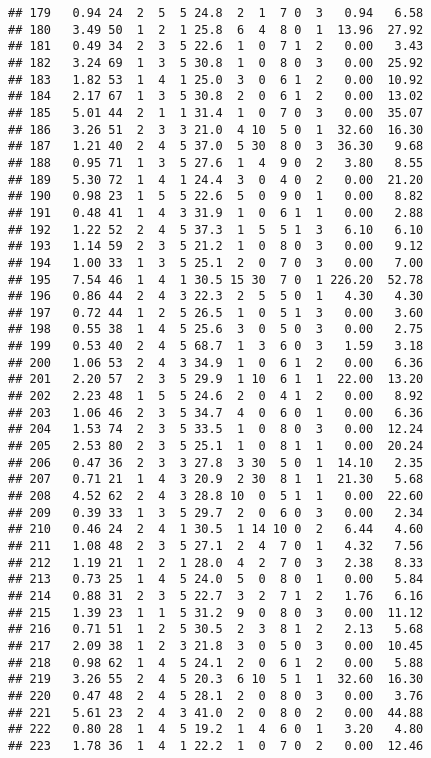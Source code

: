 \documentclass[
]{article}
\begin{document}
\begin{verbatim}
## 179   0.94 24  2  5  5 24.8  2  1  7 0  3   0.94   6.58
## 180   3.49 50  1  2  1 25.8  6  4  8 0  1  13.96  27.92
## 181   0.49 34  2  3  5 22.6  1  0  7 1  2   0.00   3.43
## 182   3.24 69  1  3  5 30.8  1  0  8 0  3   0.00  25.92
## 183   1.82 53  1  4  1 25.0  3  0  6 1  2   0.00  10.92
## 184   2.17 67  1  3  5 30.8  2  0  6 1  2   0.00  13.02
## 185   5.01 44  2  1  1 31.4  1  0  7 0  3   0.00  35.07
## 186   3.26 51  2  3  3 21.0  4 10  5 0  1  32.60  16.30
## 187   1.21 40  2  4  5 37.0  5 30  8 0  3  36.30   9.68
## 188   0.95 71  1  3  5 27.6  1  4  9 0  2   3.80   8.55
## 189   5.30 72  1  4  1 24.4  3  0  4 0  2   0.00  21.20
## 190   0.98 23  1  5  5 22.6  5  0  9 0  1   0.00   8.82
## 191   0.48 41  1  4  3 31.9  1  0  6 1  1   0.00   2.88
## 192   1.22 52  2  4  5 37.3  1  5  5 1  3   6.10   6.10
## 193   1.14 59  2  3  5 21.2  1  0  8 0  3   0.00   9.12
## 194   1.00 33  1  3  5 25.1  2  0  7 0  3   0.00   7.00
## 195   7.54 46  1  4  1 30.5 15 30  7 0  1 226.20  52.78
## 196   0.86 44  2  4  3 22.3  2  5  5 0  1   4.30   4.30
## 197   0.72 44  1  2  5 26.5  1  0  5 1  3   0.00   3.60
## 198   0.55 38  1  4  5 25.6  3  0  5 0  3   0.00   2.75
## 199   0.53 40  2  4  5 68.7  1  3  6 0  3   1.59   3.18
## 200   1.06 53  2  4  3 34.9  1  0  6 1  2   0.00   6.36
## 201   2.20 57  2  3  5 29.9  1 10  6 1  1  22.00  13.20
## 202   2.23 48  1  5  5 24.6  2  0  4 1  2   0.00   8.92
## 203   1.06 46  2  3  5 34.7  4  0  6 0  1   0.00   6.36
## 204   1.53 74  2  3  5 33.5  1  0  8 0  3   0.00  12.24
## 205   2.53 80  2  3  5 25.1  1  0  8 1  1   0.00  20.24
## 206   0.47 36  2  3  3 27.8  3 30  5 0  1  14.10   2.35
## 207   0.71 21  1  4  3 20.9  2 30  8 1  1  21.30   5.68
## 208   4.52 62  2  4  3 28.8 10  0  5 1  1   0.00  22.60
## 209   0.39 33  1  3  5 29.7  2  0  6 0  3   0.00   2.34
## 210   0.46 24  2  4  1 30.5  1 14 10 0  2   6.44   4.60
## 211   1.08 48  2  3  5 27.1  2  4  7 0  1   4.32   7.56
## 212   1.19 21  1  2  1 28.0  4  2  7 0  3   2.38   8.33
## 213   0.73 25  1  4  5 24.0  5  0  8 0  1   0.00   5.84
## 214   0.88 31  2  3  5 22.7  3  2  7 1  2   1.76   6.16
## 215   1.39 23  1  1  5 31.2  9  0  8 0  3   0.00  11.12
## 216   0.71 51  1  2  5 30.5  2  3  8 1  2   2.13   5.68
## 217   2.09 38  1  2  3 21.8  3  0  5 0  3   0.00  10.45
## 218   0.98 62  1  4  5 24.1  2  0  6 1  2   0.00   5.88
## 219   3.26 55  2  4  5 20.3  6 10  5 1  1  32.60  16.30
## 220   0.47 48  2  4  5 28.1  2  0  8 0  3   0.00   3.76
## 221   5.61 23  2  4  3 41.0  2  0  8 0  2   0.00  44.88
## 222   0.80 28  1  4  5 19.2  1  4  6 0  1   3.20   4.80
## 223   1.78 36  1  4  1 22.2  1  0  7 0  2   0.00  12.46

\end{verbatim}
\end{document}
